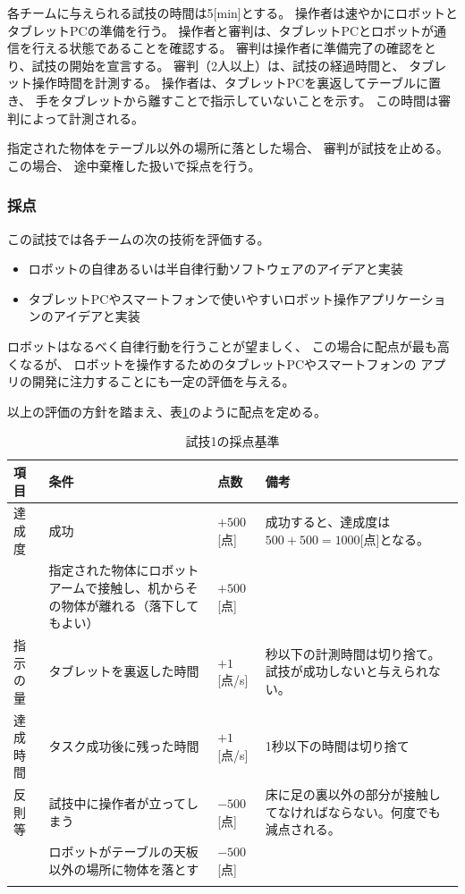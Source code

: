 \documentclass[a4j]{jarticle}
\def\thline{\noalign{\hrule height 1pt}}
\begin{document}
各チームに与えられる試技の時間は5[min]とする。
操作者は速やかにロボットとタブレットPCの準備を行う。
操作者と審判は、タブレットPCとロボットが通信を行える状態であることを確認する。
審判は操作者に準備完了の確認をとり、試技の開始を宣言する。
審判（2人以上）は、試技の経過時間と、
タブレット操作時間を計測する。
操作者は、タブレットPCを裏返してテーブルに置き、
手をタブレットから離すことで指示していないことを示す。
この時間は審判によって計測される。

指定された物体をテーブル以外の場所に落とした場合、
審判が試技を止める。この場合、
途中棄権した扱いで採点を行う。

\subsubsection{採点}

この試技では各チームの次の技術を評価する。
\begin{itemize}
	\item ロボットの自律あるいは半自律行動ソフトウェアのアイデアと実装
	\item タブレットPCやスマートフォンで使いやすいロボット操作アプリケーションのアイデアと実装
\end{itemize}
ロボットはなるべく自律行動を行うことが望ましく、
この場合に配点が最も高くなるが、
ロボットを操作するためのタブレットPCやスマートフォンの
アプリの開発に注力することにも一定の評価を与える。

以上の評価の方針を踏まえ、表\ref{table:test1score}のように配点を定める。


\begin{table}
\begin{center}
\caption{試技1の採点基準}
\label{table:test1score}
\begin{tabular}{l|p{5cm}|l|p{5cm}}
\thline
項目 & 条件 & 点数 & 備考\\
\hline
達成度 & 成功 & $+500$[点] & 成功すると、達成度は$500+500=1000$[点]となる。 \\
& 指定された物体にロボットアームで接触し、机からその物体が離れる（落下してもよい） & $+500$[点] \\
\hline
指示の量 & タブレットを裏返した時間& $+1$[点/s] & 秒以下の計測時間は切り捨て。試技が成功しないと与えられない。 \\
\hline
達成時間 & タスク成功後に残った時間 & $+1$[点/s] & 1秒以下の時間は切り捨て\\
\hline
反則等 & 試技中に操作者が立ってしまう & $-500$[点] & 床に足の裏以外の部分が接触してなければならない。何度でも減点される。 \\
	& ロボットがテーブルの天板以外の場所に物体を落とす & $-500$[点] & \\
\thline
\end{tabular}
\end{center}
\end{table}
\end{document}
